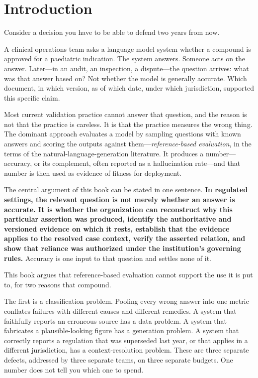 \chapter{Introduction}
\label{ch:introduction}
\label{sec:intro}

Consider a decision you have to be able to defend two years from now.

A clinical operations team asks a language model system whether a compound is
approved for a paediatric indication. The system answers. Someone acts on the
answer. Later---in an audit, an inspection, a dispute---the question arrives:
what was that answer based on? Not whether the model is generally accurate. Which
document, in which version, as of which date, under which jurisdiction, supported
this specific claim.

Most current validation practice cannot answer that question, and the reason is
not that the practice is careless. It is that the practice measures the wrong
thing. The dominant approach evaluates a model by sampling questions with known
answers and scoring the outputs against them---\emph{reference-based evaluation},
in the terms of the natural-language-generation literature. It produces a
number---accuracy, or its complement, often reported as a hallucination
rate---and that number is then used as evidence of fitness for deployment.

The central argument of this book can be stated in one sentence. \textbf{In
regulated settings, the relevant question is not merely whether an answer is
accurate. It is whether the organization can reconstruct why this particular
assertion was produced, identify the authoritative and versioned evidence on which
it rests, establish that the evidence applies to the resolved case context, verify
the asserted relation, and show that reliance was authorized under the institution's
governing rules.} Accuracy is one input to that question and settles none of it.

This book argues that reference-based evaluation cannot support the use it is put
to,
for two reasons that compound.

The first is a classification problem. Pooling every wrong answer into one
metric conflates failures with different causes and different remedies. A system
that faithfully reports an erroneous source has a data problem. A system that
fabricates a plausible-looking figure has a generation problem. A system that
correctly reports a regulation that was superseded last year, or that applies in
a different jurisdiction, has a context-resolution problem. These are three
separate defects, addressed by three separate teams, on three separate budgets.
One number does not tell you which one to spend.

